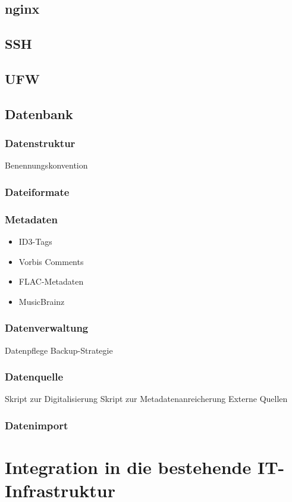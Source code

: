 \documentclass[12pt,a4paper]{report}
\begin{document}
  \subsection{nginx}
  \subsection{SSH}
  \subsection{UFW}
\subsection{Datenbank}
  \subsubsection{Datenstruktur}
    Benennungskonvention
  \subsubsection{Dateiformate}
  \subsubsection{Metadaten}
    \begin{itemize}
      \item ID3-Tags
      \item Vorbis Comments
      \item FLAC-Metadaten
      \item MusicBrainz
    \end{itemize}
  \subsubsection{Datenverwaltung}
    Datenpflege
    Backup-Strategie
  \subsubsection{Datenquelle}
    Skript zur Digitalisierung
    Skript zur Metadatenanreicherung
    Externe Quellen
  \subsubsection{Datenimport}
\section{Integration in die bestehende IT-Infrastruktur}
\end{document}
